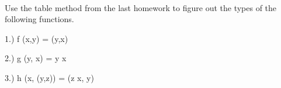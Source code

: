 \documentclass[11pt]{article}
\begin{document}

\ \\

Use the table method from the last homework to figure out the types of the following functions.


\begin{description}
\item{1.)}  f (x,y) = (y,x)

\item{2.)} g (y, x) = y x

\item{3.)} h (x, (y,z)) = (z x, y)


\end{description}
\end{document}
